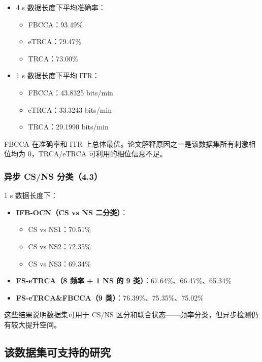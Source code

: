 \documentclass[12pt, a4paper]{ctexart}
\begin{document}
\begin{itemize}
  \item 4 s 数据长度下平均准确率：
  \begin{itemize}
    \item FBCCA：93.49\%
    \item eTRCA：79.47\%
    \item TRCA：73.00\%
  \end{itemize}
  \item 1 s 数据长度下平均 ITR：
  \begin{itemize}
    \item FBCCA：43.8325 bits/min
    \item eTRCA：33.3243 bits/min
    \item TRCA：29.1990 bits/min
  \end{itemize}
\end{itemize}

FBCCA 在准确率和 ITR 上总体最优。论文解释原因之一是该数据集所有刺激相位均为 0，TRCA/eTRCA 可利用的相位信息不足。

\subsubsection*{异步 CS/NS 分类（4.3）}

1 s 数据长度下：

\begin{itemize}
  \item \textbf{IFB-OCN（CS vs NS 二分类）}：
  \begin{itemize}
    \item CS vs NS1：70.51\%
    \item CS vs NS2：72.35\%
    \item CS vs NS3：69.34\%
  \end{itemize}
  \item \textbf{FS-eTRCA（8 频率 + 1 NS 的 9 类）}：67.64\%、66.47\%、65.34\%
  \item \textbf{FS-eTRCA\&FBCCA（9 类）}：76.39\%、75.35\%、75.02\%
\end{itemize}

这些结果说明数据集可用于 CS/NS 区分和联合状态——频率分类，但异步检测仍有较大提升空间。

\subsection{该数据集可支持的研究}
\end{document}

